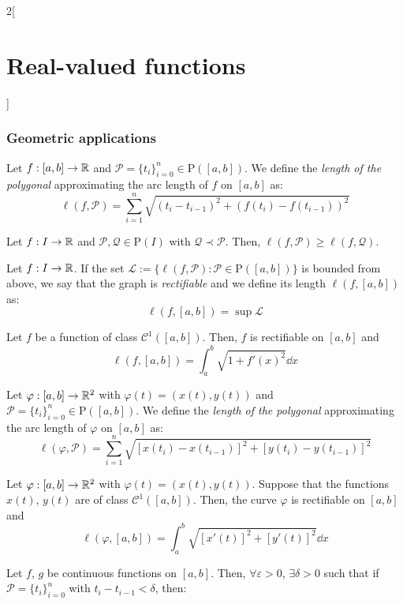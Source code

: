 \documentclass[../../../main.tex]{subfiles}
\begin{document}
\begin{multicols}{2}[\section{Real-valued functions}]
  \subsubsection{Geometric applications}
  \begin{definition}
    Let $f:[a,b]\rightarrow\mathbb{R}$ and $\mathcal{P}=\{t_i\}_{i=0}^n\in\mathrm{P}([a,b])$. We define the \emph{length of the polygonal} approximating the arc length of $f$ on $[a,b]$ as: $$\ell(f,\mathcal{P})=\sum_{i=1}^n\sqrt{{(t_i-t_{i-1})}^2+{(f(t_i)-f(t_{i-1}))}^2}$$
  \end{definition}
  \begin{lemma}
    Let $f:I\rightarrow\mathbb{R}$ and $\mathcal{P},\mathcal{Q}\in\mathrm{P}(I)$ with $\mathcal{Q}\prec\mathcal{P}$. Then, $\ell(f,\mathcal{P})\geq \ell(f,\mathcal{Q})$.
  \end{lemma}
  \begin{definition}
    Let $f:I\rightarrow\mathbb{R}$. If the set $\mathcal{L}:=\{\ell(f,\mathcal{P}):\mathcal{P}\in\mathrm{P}([a,b])\}$ is bounded from above, we say that the graph is \emph{rectifiable} and we define its length $\ell(f,[a,b])$ as: $$\ell(f,[a,b])=\sup \mathcal{L}$$
  \end{definition}
  \begin{proposition}
    Let $f$ be a function of class $\mathcal{C}^1([a,b])$. Then, $f$ is rectifiable on $[a,b]$ and $$\ell(f,[a,b])=\int_a^b\sqrt{1+{f'(x)}^2}\dd{x}$$
  \end{proposition}
  \begin{definition}
    Let $\varphi:[a,b]\rightarrow\mathbb{R}^2$ with $\varphi(t)=(x(t),y(t))$ and $\mathcal{P}=\{t_i\}_{i=0}^n\in\mathrm{P}([a,b])$. We define the \emph{length of the polygonal} approximating the arc length of $\varphi$ on $[a,b]$ as: $$\ell(\varphi,\mathcal{P})=\sum_{i=1}^n\sqrt{{[x(t_i)-x(t_{i-1})]}^2+{[y(t_i)-y(t_{i-1})]}^2}$$
  \end{definition}
  \begin{proposition}
    Let $\varphi:[a,b]\rightarrow\mathbb{R}^2$ with $\varphi(t)=(x(t),y(t))$. Suppose that the functions $x(t)$, $y(t)$ are of class $\mathcal{C}^1([a,b])$. Then, the curve $\varphi$ is rectifiable on $[a,b]$ and $$\ell(\varphi,[a,b])=\int_a^b\sqrt{{[x'(t)]}^2+{[y'(t)]}^2}\dd{x}$$
  \end{proposition}
  \begin{lemma}
    Let $f$, $g$ be continuous functions on $[a,b]$. Then, $\forall\varepsilon>0$, $\exists\delta>0$ such that if $\mathcal{P}=\{t_i\}_{i=0}^n$ with $t_i-t_{i-1}<\delta$, then:
    \begin{multline*}

\end{multline*}
\end{lemma}
\end{multicols}
\end{document}

